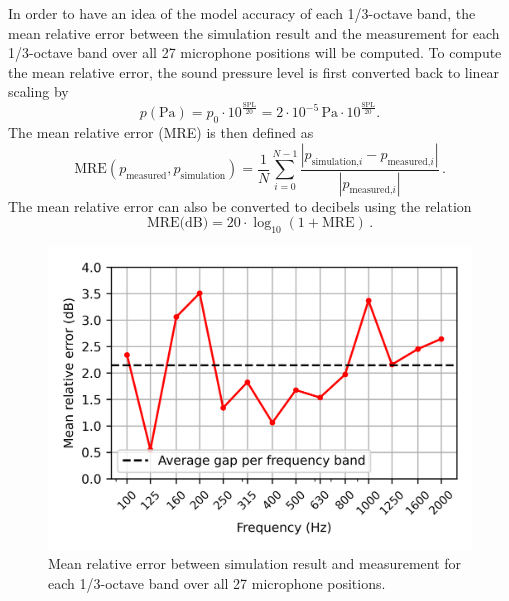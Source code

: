 In order to have an idea of the model accuracy of each 1/3-octave band, the mean relative error between the simulation result and the measurement for each 1/3-octave band over all 27 microphone positions will be computed. To compute the mean relative error, the sound pressure level is first converted back to linear scaling by
\begin{equation}
	p(\text{Pa}) = p_0 \cdot 10^{\frac{\text{SPL}}{20}} = 2\cdot10^{-5}\,\text{Pa} \cdot 10^{\frac{\text{SPL}}{20}}\text{.}
\end{equation}
The mean relative error (MRE) is then defined as
\begin{equation}
	\text{MRE}(p_{\text{measured}}, p_{\text{simulation}}) = \frac{1}{N} \sum_{i=0}^{N - 1} \frac{|p_{\text{simulation,}i} - p_{\text{measured,}i}|}{|p_{\text{measured,}i}|}\,.
\end{equation}
The mean relative error can also be converted to decibels using the relation
\begin{equation}
	\text{MRE(dB)} = 20\cdot\log_{10}(1 + \text{MRE})\,.
\end{equation}

\begin{figure}
	\centering
	\includegraphics{fig/chap5/initial_model/freq_spectrum/average_gap.png}
	\caption{Mean relative error between simulation result and measurement for each 1/3-octave band over all 27 microphone positions.}
	\label{fig:gap_freq_spectrum}
\end{figure}

